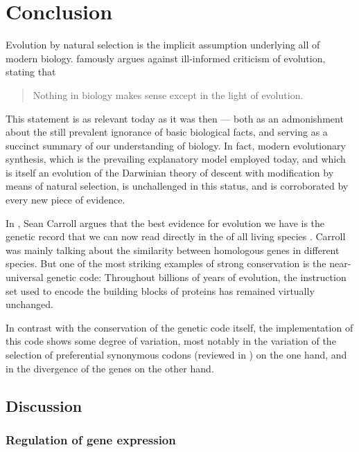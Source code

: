 \chapter{Conclusion}
\label{sec:conclusion}


\noindent
Evolution by natural selection is the implicit assumption underlying all of
modern biology. \citet{Dobzhansky:1973} famously argues against ill-informed
criticism of evolution, stating that

\begin{quote}
    Nothing in biology makes sense except in the light of evolution.
\end{quote}

This statement is as relevant today as it was then --- both as an admonishment
about the still prevalent ignorance of basic biological facts, and serving as a
succinct summary of our understanding of biology. In fact, modern evolutionary
synthesis, which is the prevailing explanatory model employed today, and which
is itself an evolution of the Darwinian theory of descent with modification by
means of natural selection, is unchallenged in this status, and is corroborated
by every new piece of evidence.

In , Sean Carroll argues that the best
evidence for evolution we have is the genetic record that we can now read
directly in the \dna of all living species \citep{Carroll:2006}. Carroll was
mainly talking about the similarity between homologous genes in different
species. But one of the most striking examples of strong conservation is the
near-universal genetic code: Throughout billions of years of evolution, the
instruction set used to encode the building blocks of proteins has remained
virtually unchanged.

In contrast with the conservation of the genetic code itself, the implementation
of this code shows some degree of variation, most notably in the variation of
the selection of preferential synonymous codons (reviewed in
\citet{Ermolaeva:2001}) on the one hand, and in the divergence of the \trna
genes \citep{Kutter:2011} on the other hand.

\section{Discussion}

\subsection{Regulation of  gene expression}

